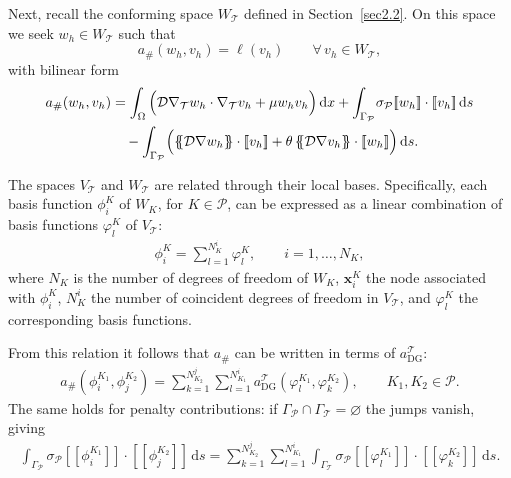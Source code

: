 \documentclass[11pt,final]{amsart}
\theoremstyle{plain}
\theoremstyle{definition}
\newcommand\calP{{\mathcal{P}}}
\newcommand\calT{{\mathcal{T}}}
\newcommand{\mesh}{\calP}
\newcommand{\mean}[1]{\{\kern-1.1mm\{#1\}\kern-1.1mm\}}
\newcommand{\jump}[1]{[\![#1]\!]}                        %
\begin{document}
Next, recall the conforming space $W_\calT$ defined in
Section~\ref{sec2.2}. On this space we seek $w_{h}\in W_\calT$ such
that
\begin{equation}
  a_{\#}(w_{h},v_{h}) = \ell(v_{h}) \qquad \forall\, v_{h}\in W_\calT, \label{DG22} 
\end{equation}
with bilinear form
\begin{equation}
  \begin{split}
    a_{\#}(w_{h},v_{h})
    &=
    \int_\Omega \Big(\mathcal{D}\nabla_{\calT} w_{h}\cdot \nabla_{\calT} v_h
    + \mu w_{h}v_h\Big)\,\mathrm{d}x 
    +
    \int_{\Gamma_\mesh}\!\sigma_\mesh \jump{w_{h}}\cdot \jump{v_h}\,\mathrm{d}s
    \\
    &\quad
    -
    \int_{\Gamma_{\mesh}}\!\Big(\mean{\mathcal{D}\nabla w_{h}}\cdot \jump{v_h}
    + \theta \,\mean{\mathcal{D}\nabla v_h}\cdot \jump{w_{h}}\Big)\,\mathrm{d}s.
  \end{split}
\end{equation}

The spaces $V_\calT$ and $W_\calT$ are related through their local
bases. Specifically, each basis function $\phi_{i}^{K}$ of $W_{K}$,
for $K\in \calP$, can be expressed as a linear combination of basis
functions $\varphi_{l}^{K}$ of $V_{\calT}$:
\begin{align}
	\phi_{i}^{K}=\sum_{l=1}^{N_{K}^{i}}  \varphi_{l}^{K}, \qquad i=1,\ldots,N_{K},
\end{align}
where $N_{K}$ is the number of degrees of freedom of $W_{K}$,
$\mathbf{x}_{i}^{K}$ the node associated with $\phi_{i}^{K}$,
$N^{i}_{K}$ the number of coincident degrees of freedom in $V_\calT$,
and $\varphi_{l}^{K}$ the corresponding basis functions.

From this relation it follows that $a_{\#}$ can be written in terms of
$a_{\mathrm{DG}}^{\calT}$:
\begin{align}
  a_{\#}(\phi_{i}^{K_{1}},\phi_{j}^{K_{2}})
  =
  \sum_{k=1}^{N^{j}_{K_{2}}}\sum_{l=1}^{N^{i}_{K_{1}}}a_{\mathrm{DG}}^{\calT}(\varphi_{l}^{K_{1}},\varphi_{k}^{K_{2}}), 
  \qquad K_{1},K_{2}\in \calP. \label{Projection1}
\end{align}
The same holds for penalty contributions: if
$\Gamma_\mesh\cap\Gamma_\calT=\varnothing$ the jumps vanish, giving
\begin{align}
  \int_{\Gamma_\mesh} \sigma_\mesh\jump{\phi_{i}^{K_{1}}}\cdot\jump{\phi_{j}^{K_{2}}}\,\mathrm{d}s
  =
  \sum_{k=1}^{N^{j}_{K_{2}}}\sum_{l=1}^{N^{i}_{K_{1}}}\int_{\Gamma_{\calT}}\sigma_\mesh \jump{\varphi_{l}^{K_{1}}}\cdot\jump{\varphi_{k}^{K_{2}}}\,\mathrm{d}s. \label{penalty11}
\end{align}
\end{document}
